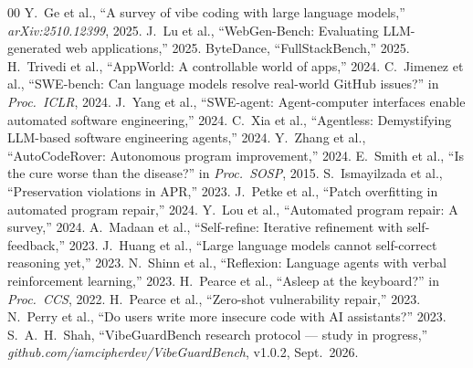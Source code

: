 \documentclass[conference]{IEEEtran}
\begin{document}
\begin{thebibliography}{00}
 Y.~Ge et al., ``A survey of vibe coding with large language models,'' \textit{arXiv:2510.12399}, 2025.
 J.~Lu et al., ``WebGen-Bench: Evaluating LLM-generated web applications,'' 2025.
 ByteDance, ``FullStackBench,'' 2025.
 H.~Trivedi et al., ``AppWorld: A controllable world of apps,'' 2024.
 C.~Jimenez et al., ``SWE-bench: Can language models resolve real-world GitHub issues?'' in \textit{Proc.\ ICLR}, 2024.
 J.~Yang et al., ``SWE-agent: Agent-computer interfaces enable automated software engineering,'' 2024.
 C.~Xia et al., ``Agentless: Demystifying LLM-based software engineering agents,'' 2024.
 Y.~Zhang et al., ``AutoCodeRover: Autonomous program improvement,'' 2024.
 E.~Smith et al., ``Is the cure worse than the disease?'' in \textit{Proc.\ SOSP}, 2015.
 S.~Ismayilzada et al., ``Preservation violations in APR,'' 2023.
 J.~Petke et al., ``Patch overfitting in automated program repair,'' 2024.
 Y.~Lou et al., ``Automated program repair: A survey,'' 2024.
 A.~Madaan et al., ``Self-refine: Iterative refinement with self-feedback,'' 2023.
 J.~Huang et al., ``Large language models cannot self-correct reasoning yet,'' 2023.
 N.~Shinn et al., ``Reflexion: Language agents with verbal reinforcement learning,'' 2023.
 H.~Pearce et al., ``Asleep at the keyboard?'' in \textit{Proc.\ CCS}, 2022.
 H.~Pearce et al., ``Zero-shot vulnerability repair,'' 2023.
 N.~Perry et al., ``Do users write more insecure code with AI assistants?'' 2023.
 S.~A.~H.~Shah, ``VibeGuardBench research protocol --- study in progress,'' \textit{github.com/iamcipherdev/VibeGuardBench}, v1.0.2, Sept.\ 2026.
\end{thebibliography}
\end{document}
